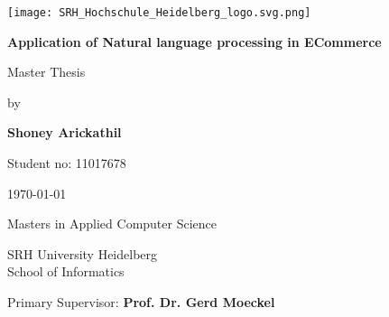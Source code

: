 \begin{titlepage}

    \vspace*{5\baselineskip}
        \begin{flushright}        
  
                \texttt{[image: SRH\_Hochschule\_Heidelberg\_logo.svg.png]}
           
        \end{flushright}
    \vspace*{5\baselineskip}

    \centering
   


    {\Large \bfseries Application of Natural language processing in ECommerce}
    \vspace*{3\baselineskip}

    {\Large Master Thesis}
    \vspace*{1\baselineskip}

    {\Large by }
    \vspace*{2\baselineskip}

    {\Large  \bfseries Shoney Arickathil }
    \vspace*{0.5\baselineskip}

    {\Large  Student no: 11017678 }
    \vspace*{2\baselineskip}

    {\Large \today}
    \vspace*{8\baselineskip}


    {\Large  Masters in Applied Computer Science }
    \vspace*{0.5\baselineskip}

    {\Large  SRH University Heidelberg \\ School of Informatics}  
    \vspace*{6\baselineskip}

    \begin{minipage}{\textwidth}
        \begin{flushleft} %
            \large Primary Supervisor: \hfill \bfseries Prof. Dr. Gerd Moeckel
           
        \end{flushleft}
       
       
    \end{minipage}

    


   
    
\end{titlepage}